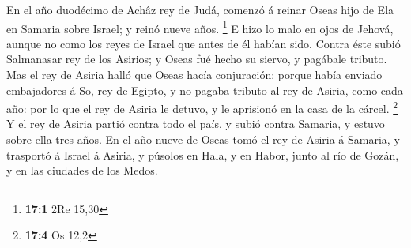  En el año duodécimo de Achâz rey de Judá, comenzó á reinar
Oseas hijo de Ela en Samaria sobre Israel; y reinó nueve años.
\footnote{\textbf{17:1} 2Re 15,30}  E hizo lo malo en ojos
de Jehová, aunque no como los reyes de Israel que antes de él habían
sido.  Contra éste subió Salmanasar rey de los Asirios; y
Oseas fué hecho su siervo, y pagábale tributo.  Mas el rey
de Asiria halló que Oseas hacía conjuración: porque había enviado
embajadores á So, rey de Egipto, y no pagaba tributo al rey de Asiria,
como cada año: por lo que el rey de Asiria le detuvo, y le aprisionó en
la casa de la cárcel. \footnote{\textbf{17:4} Os 12,2}  Y el
rey de Asiria partió contra todo el país, y subió contra Samaria, y
estuvo sobre ella tres años.  En el año nueve de Oseas tomó
el rey de Asiria á Samaria, y trasportó á Israel á Asiria, y púsolos en
Hala, y en Habor, junto al río de Gozán, y en las ciudades de los Medos.

